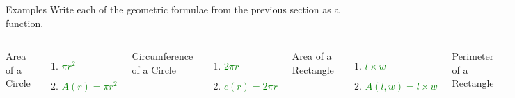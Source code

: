 \documentclass{beamer}
\begin{document}
\begin{frame}{Examples}
  Write each of the geometric formulae from the previous section as a function.

  \begin{columns}
  Area of a Circle
  \begin{enumerate}[<+(1)->]
    \item \textcolor{green}{$\pi r^2$}
    \item \textcolor{green}{$A(r) = \pi r^2$}
  \end{enumerate}

  Circumference of a Circle
  \begin{enumerate}[<+(1)->]
    \item \textcolor{green}{$2\pi r$}
    \item \textcolor{green}{$c(r) = 2\pi r$}
  \end{enumerate}

  Area of a Rectangle
  \begin{enumerate}[<+(1)->]
    \item \textcolor{green}{$l \times w$}
    \item \textcolor{green}{$A(l, w) = l \times w$}
  \end{enumerate}

  Perimeter of a Rectangle
  \begin{enumerate}[<+(1)->]
    \item \textcolor{green}{$P(l, w) = 2 \times l + 2 \times w$}
  \end{enumerate}

  Area of a Triangle
  \begin{enumerate}[<+(1)->]
    \item \textcolor{green}{$\frac{1}{2} b h$}
    \item \textcolor{green}{$A(b,h) = \frac{1}{2} bh$}
  \end{enumerate}

  Surface Area of A Sphere
  \begin{enumerate}[<+(1)->]
    \item \textcolor{green}{$4 \pi r^2$}
    \item \textcolor{green}{$S(r) = 4 \pi r^2$}
  \end{enumerate}

  Volume of a Sphere
  \begin{enumerate}[<+(1)->]
    \item \textcolor{green}{$\frac{4}{3} \pi r^3$}
    \item \textcolor{green}{$V(r) = \frac{4}{3} \pi r^3$}
  \end{enumerate}
  \end{columns}
\end{frame}
\end{document}
